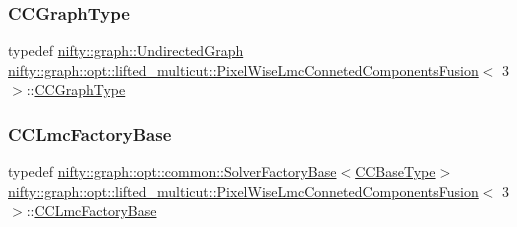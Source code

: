 \subsubsection{\texorpdfstring{C\+C\+Graph\+Type}{CCGraphType}}
{\footnotesize\ttfamily typedef \hyperlink{classnifty_1_1graph_1_1UndirectedGraph}{nifty\+::graph\+::\+Undirected\+Graph} \hyperlink{classnifty_1_1graph_1_1opt_1_1lifted__multicut_1_1PixelWiseLmcConnetedComponentsFusion}{nifty\+::graph\+::opt\+::lifted\+\_\+multicut\+::\+Pixel\+Wise\+Lmc\+Conneted\+Components\+Fusion}$<$ 3 $>$\+::\hyperlink{classnifty_1_1graph_1_1opt_1_1lifted__multicut_1_1PixelWiseLmcConnetedComponentsFusion_3_013_01_4_abbfd6800c04cc256d689973355268452}{C\+C\+Graph\+Type}}

\mbox{\label{classnifty_1_1graph_1_1opt_1_1lifted__multicut_1_1PixelWiseLmcConnetedComponentsFusion_3_013_01_4_a9e78fe926b2fe9e0d3f4b8fa2c4fed1f}} 
\subsubsection{\texorpdfstring{C\+C\+Lmc\+Factory\+Base}{CCLmcFactoryBase}}
{\footnotesize\ttfamily typedef \hyperlink{classnifty_1_1graph_1_1opt_1_1common_1_1SolverFactoryBase}{nifty\+::graph\+::opt\+::common\+::\+Solver\+Factory\+Base}$<$\hyperlink{classnifty_1_1graph_1_1opt_1_1lifted__multicut_1_1PixelWiseLmcConnetedComponentsFusion_3_013_01_4_ac1b60c33540a464d9d21651885d12ba4}{C\+C\+Base\+Type}$>$ \hyperlink{classnifty_1_1graph_1_1opt_1_1lifted__multicut_1_1PixelWiseLmcConnetedComponentsFusion}{nifty\+::graph\+::opt\+::lifted\+\_\+multicut\+::\+Pixel\+Wise\+Lmc\+Conneted\+Components\+Fusion}$<$ 3 $>$\+::\hyperlink{classnifty_1_1graph_1_1opt_1_1lifted__multicut_1_1PixelWiseLmcConnetedComponentsFusion_3_013_01_4_a9e78fe926b2fe9e0d3f4b8fa2c4fed1f}{C\+C\+Lmc\+Factory\+Base}}

